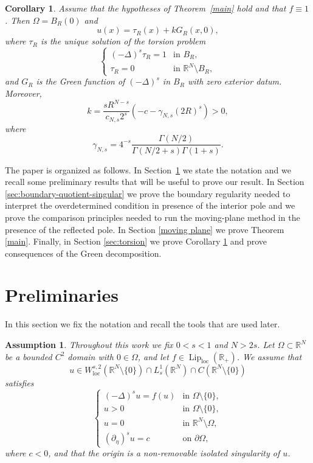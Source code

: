 \documentclass[11pt,a4paper]{article}
\newtheorem{corollary}[theorem]{Corollary}
\newtheorem{assumption}[theorem]{Assumption}
\newcommand{\R}{\mathbb R}
\newcommand{\Lip}{\operatorname{Lip}}
\newcommand{\loc}{\mathrm{loc}}
\begin{document}
\begin{corollary}
\label{torsion}
Assume that the hypotheses of Theorem~\ref{main} hold and that \(f\equiv1\). Then \(\Omega=B_R(0)\) and
\[
u(x)=\tau_{R}(x)+k G_{R}(x,0),
\]
where \(\tau_{R}\) is the unique solution of the torsion problem
\[
\begin{cases}
(-\Delta)^s\tau_{R}=1 & \text{in }B_R,\\
\tau_{R}=0 & \text{in }\R^N\setminus B_R,
\end{cases}
\]
and \(G_{R}\) is the Green function of \((-\Delta)^s\) in \(B_R\) with zero exterior datum. Moreover,
\[
k=
\frac{sR^{N-s}}{c_{N,s}2^s}
\left(-c-\gamma_{N,s}(2R)^s\right)>0,
\]
where
\[
\gamma_{N,s}
=
4^{-s}
\frac{\Gamma(N/2)}{\Gamma(N/2+s)\Gamma(1+s)}.
\]
\end{corollary}


The paper is organized as follows. In Section~\ref{sec:preliminaries} we state the notation and we recall
some preliminary results that will be useful to prove our result. In Section \ref{sec:boundary-quotient-singular} we prove the boundary regularity needed to interpret the overdetermined condition in presence of the interior pole and we prove the comparison principles needed to run the moving-plane method in the presence of the reflected pole. In Section \ref{moving plane} we prove Theorem \ref{main}. Finally, in Section \ref{sec:torsion} we prove Corollary \ref{torsion} and prove consequences of the Green decomposition.

\section{Preliminaries}
\label{sec:preliminaries}

In this section we fix the notation and recall the tools that are used later.

\begin{assumption}
Throughout this work we fix \(0<s<1\) and \(N>2s\). Let \(\Omega\subset\R^N\) be a bounded \(C^2\) domain with \(0\in\Omega\), and let \(f\in\Lip_{\loc}(\R_+)\). We assume that
\[
u\in W^{s,2}_{\loc}(\R^N\setminus\{0\})
\cap L^1_s(\R^N)
\cap C(\R^N\setminus\{0\})
\]
satisfies
\[
\begin{cases}
(-\Delta)^s u=f(u) & \text{in }\Omega\setminus\{0\},\\
u>0 & \text{in }\Omega\setminus\{0\},\\
u=0 & \text{in }\R^N\setminus\Omega,\\
(\partial_\eta)^s u=c & \text{on }\partial\Omega,
\end{cases}
\]
where \(c<0\), and that the origin is a non-removable isolated singularity of
\(u\).
\end{assumption}
\end{document}

